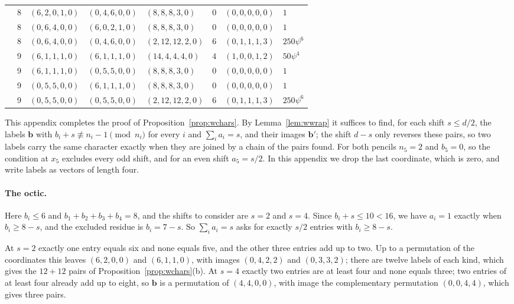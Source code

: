 \documentclass[11pt]{amsart}
\theoremstyle{definition}
\theoremstyle{remark}
\newcommand{\bb}{\mathbf{b}}
\begin{document}
\begin{table}[t]
\begin{tabular}{lrlllrll}
 & 8 & $(6,2,0,1,0)$ & $(0,4,6,0,0)$ & $(8,8,8,3,0)$ & $0$ & $(0,0,0,0,0)$ & $1$\\
 & 8 & $(0,6,4,0,0)$ & $(6,0,2,1,0)$ & $(8,8,8,3,0)$ & $0$ & $(0,0,0,0,0)$ & $1$\\
 & 8 & $(0,6,4,0,0)$ & $(0,4,6,0,0)$ & $(2,12,12,2,0)$ & $6$ & $(0,1,1,1,3)$ & $250\psi^{6}$\\
 & 9 & $(6,1,1,1,0)$ & $(6,1,1,1,0)$ & $(14,4,4,4,0)$ & $4$ & $(1,0,0,1,2)$ & $50\psi^{4}$\\
 & 9 & $(6,1,1,1,0)$ & $(0,5,5,0,0)$ & $(8,8,8,3,0)$ & $0$ & $(0,0,0,0,0)$ & $1$\\
 & 9 & $(0,5,5,0,0)$ & $(6,1,1,1,0)$ & $(8,8,8,3,0)$ & $0$ & $(0,0,0,0,0)$ & $1$\\
 & 9 & $(0,5,5,0,0)$ & $(0,5,5,0,0)$ & $(2,12,12,2,0)$ & $6$ & $(0,1,1,1,3)$ & $250\psi^{6}$\\
\bottomrule
\end{tabular}
\end{table}

This appendix completes the proof of Proposition~\ref{prop:wchars}. By
Lemma~\ref{lem:wwrap} it suffices to find, for each shift $s\le d/2$, the
labels $\bb$ with $b_i+s\not\equiv n_i-1\pmod{n_i}$ for every $i$ and
$\sum_ia_i=s$, and their images $\bb'$; the shift $d-s$ only reverses
these pairs, so two labels carry the same character exactly when they are
joined by a chain of the pairs found. For both pencils $n_5=2$ and
$b_5=0$, so the condition at $x_5$ excludes every odd shift, and for an
even shift $a_5=s/2$. In this appendix we drop the last coordinate, which
is zero, and write labels as vectors of length four.

\paragraph*{The octic.}
Here $b_i\le6$ and $b_1+b_2+b_3+b_4=8$, and the shifts to consider are
$s=2$ and $s=4$. Since $b_i+s\le10<16$, we have $a_i=1$ exactly when
$b_i\ge8-s$, and the excluded residue is $b_i=7-s$. So $\sum_ia_i=s$ asks
for exactly $s/2$ entries with $b_i\ge8-s$.

At $s=2$ exactly one entry equals six and none equals five, and the other
three entries add up to two. Up to a permutation of the coordinates this
leaves $(6,2,0,0)$ and $(6,1,1,0)$, with images $(0,4,2,2)$ and
$(0,3,3,2)$; there are twelve labels of each kind, which gives the $12+12$
pairs of Proposition~\ref{prop:wchars}(b). At $s=4$ exactly two entries are
at least four and none equals three; two entries of at least four already
add up to eight, so $\bb$ is a permutation of $(4,4,0,0)$, with image the
complementary permutation $(0,0,4,4)$, which gives three pairs.
\end{document}
